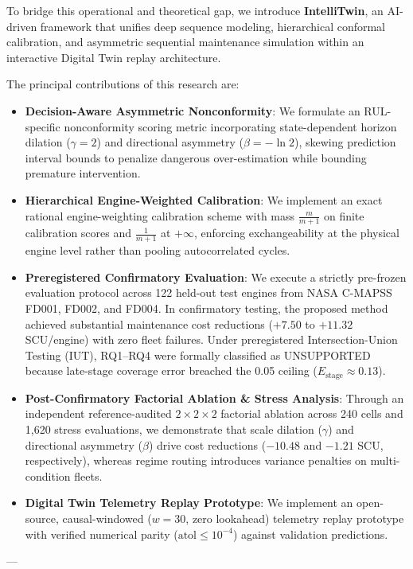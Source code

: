 \documentclass[conference]{IEEEtran}
\begin{document}
To bridge this operational and theoretical gap, we introduce \textbf{IntelliTwin}, an AI-driven framework that unifies deep sequence modeling, hierarchical conformal calibration, and asymmetric sequential maintenance simulation within an interactive Digital Twin replay architecture. 

The principal contributions of this research are:
\begin{itemize}
    \item \textbf{Decision-Aware Asymmetric Nonconformity}: We formulate an RUL-specific nonconformity scoring metric incorporating state-dependent horizon dilation ($\gamma=2$) and directional asymmetry ($\beta=-\ln 2$), skewing prediction interval bounds to penalize dangerous over-estimation while bounding premature intervention.
    \item \textbf{Hierarchical Engine-Weighted Calibration}: We implement an exact rational engine-weighting calibration scheme with mass $\frac{m}{m+1}$ on finite calibration scores and $\frac{1}{m+1}$ at $+\infty$, enforcing exchangeability at the physical engine level rather than pooling autocorrelated cycles.
    \item \textbf{Preregistered Confirmatory Evaluation}: We execute a strictly pre-frozen evaluation protocol across 122 held-out test engines from NASA C-MAPSS FD001, FD002, and FD004. In confirmatory testing, the proposed method achieved substantial maintenance cost reductions ($+7.50$ to $+11.32$ SCU/engine) with zero fleet failures. Under preregistered Intersection-Union Testing (IUT), RQ1--RQ4 were formally classified as UNSUPPORTED because late-stage coverage error breached the 0.05 ceiling ($E_{\text{stage}} \approx 0.13$).
    \item \textbf{Post-Confirmatory Factorial Ablation & Stress Analysis}: Through an independent reference-audited $2 \times 2 \times 2$ factorial ablation across 240 cells and 1,620 stress evaluations, we demonstrate that scale dilation ($\gamma$) and directional asymmetry ($\beta$) drive cost reductions ($-10.48$ and $-1.21$ SCU, respectively), whereas regime routing introduces variance penalties on multi-condition fleets.
    \item \textbf{Digital Twin Telemetry Replay Prototype}: We implement an open-source, causal-windowed ($w=30$, zero lookahead) telemetry replay prototype with verified numerical parity ($\text{atol} \le 10^{-4}$) against validation predictions.
\end{itemize}

---
\end{document}
